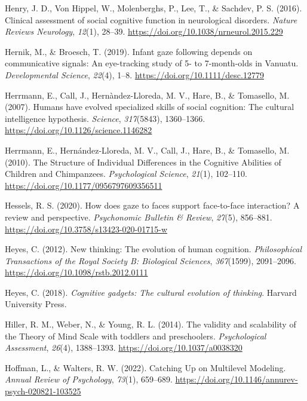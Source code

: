 \documentclass[
]{scrbook}
\newlength{\cslhangindent}
\newenvironment{CSLReferences}[2] %
 {\begin{list}{}{%
  \setlength{\itemindent}{0pt}
  \setlength{\leftmargin}{0pt}
  \setlength{\parsep}{0pt}
  \ifodd #1
   \setlength{\leftmargin}{\cslhangindent}
   \setlength{\itemindent}{-1\cslhangindent}
  \fi
  \setlength{\itemsep}{#2\baselineskip}}}
 {\end{list}}
\begin{document}
\begin{CSLReferences}{1}{0}
Henry, J. D., Von Hippel, W., Molenberghs, P., Lee, T., \& Sachdev, P. S. (2016). Clinical assessment of social cognitive function in neurological disorders. \emph{Nature Reviews Neurology}, \emph{12}(1), 28--39. \url{https://doi.org/10.1038/nrneurol.2015.229}

Hernik, M., \& Broesch, T. (2019). Infant gaze following depends on communicative signals: {An} eye-tracking study of 5- to 7-month-olds in {Vanuatu}. \emph{Developmental Science}, \emph{22}(4), 1--8. \url{https://doi.org/10.1111/desc.12779}

Herrmann, E., Call, J., Hernàndez-Lloreda, M. V., Hare, B., \& Tomasello, M. (2007). Humans have evolved specialized skills of social cognition: The cultural intelligence hypothesis. \emph{Science}, \emph{317}(5843), 1360--1366. \url{https://doi.org/10.1126/science.1146282}

Herrmann, E., Hernández-Lloreda, M. V., Call, J., Hare, B., \& Tomasello, M. (2010). The {Structure} of {Individual Differences} in the {Cognitive Abilities} of {Children} and {Chimpanzees}. \emph{Psychological Science}, \emph{21}(1), 102--110. \url{https://doi.org/10.1177/0956797609356511}

Hessels, R. S. (2020). How does gaze to faces support face-to-face interaction? {A} review and perspective. \emph{Psychonomic Bulletin \& Review}, \emph{27}(5), 856--881. \url{https://doi.org/10.3758/s13423-020-01715-w}

Heyes, C. (2012). New thinking: The evolution of human cognition. \emph{Philosophical Transactions of the Royal Society B: Biological Sciences}, \emph{367}(1599), 2091--2096. \url{https://doi.org/10.1098/rstb.2012.0111}

Heyes, C. (2018). \emph{Cognitive gadgets: {The} cultural evolution of thinking}. Harvard University Press.

Hiller, R. M., Weber, N., \& Young, R. L. (2014). The validity and scalability of the {Theory} of {Mind Scale} with toddlers and preschoolers. \emph{Psychological Assessment}, \emph{26}(4), 1388--1393. \url{https://doi.org/10.1037/a0038320}

Hoffman, L., \& Walters, R. W. (2022). Catching {Up} on {Multilevel Modeling}. \emph{Annual Review of Psychology}, \emph{73}(1), 659--689. \url{https://doi.org/10.1146/annurev-psych-020821-103525}


\end{CSLReferences}
\end{document}
